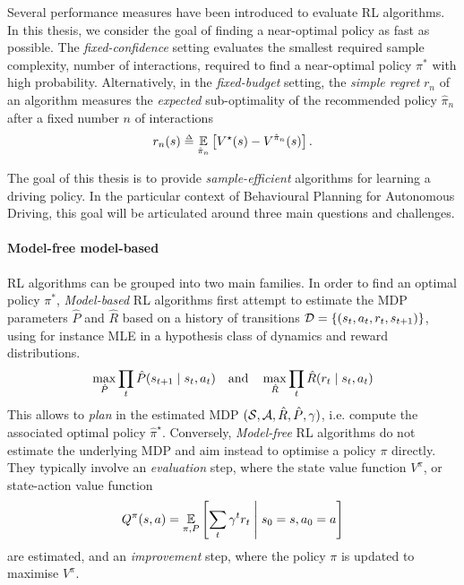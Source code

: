 Several performance measures have been introduced to evaluate \ac*{RL} algorithms. In this thesis, we consider the goal of finding a near-optimal policy as fast as possible. The \emph{fixed-confidence} setting evaluates the smallest required sample complexity, \ie number of interactions, required to find a near-optimal policy $\pi^*$ with high probability. Alternatively, in the \emph{fixed-budget} setting, the \emph{simple regret} $r_n$ of an algorithm measures the \emph{expected} sub-optimality of the recommended policy $\hat{\pi}_n$ after a fixed number $n$ of interactions
\begin{equation*}
r_n(s) \eqdef \expectedvalue_{\hat{\pi}_n} \left[ V^\star(s) - V^{\hat{\pi}_n}(s) \right].
\end{equation*}


The goal of this thesis is to provide \emph{sample-efficient} algorithms for learning a driving policy. In the particular context of Behavioural Planning for Autonomous Driving, this goal will be articulated around three main questions and challenges.

\paragraph{Model-free \vs model-based}

\ac*{RL} algorithms can be grouped into two main families. 
In order to find an optimal policy $\pi^*$, \emph{Model-based} \ac*{RL} algorithms first attempt to estimate the \ac*{MDP} parameters $\hat{P}$ and $\hat{R}$ based on a history of transitions $\mathcal{D} = \{(s_{t},a_t, r_t, s_{t+1})\}$, using for instance \ac{MLE} in a hypothesis class of dynamics and reward distributions.
\begin{equation*}
\max_{\hat{P}} \prod_{t}\hat{P}\lparen s_{t+1} \mid s_t,a_t\rparen \quad \text{and} \quad \max_{\hat{R}} \prod_{t}\hat{R}\lparen r_{t} \mid s_t,a_t\rparen
\end{equation*}
This allows to \emph{plan} in the estimated \ac*{MDP} $(\mathcal{S},\mathcal{A},\hat{R}, \hat{P}, \gamma)$, i.e. compute the associated optimal policy $\hat{\pi}^\star$. Conversely, \emph{Model-free} \ac*{RL} algorithms do not estimate the underlying \ac*{MDP} and aim instead to optimise a policy $\pi$ directly. They typically involve an \emph{evaluation} step, where the state value function $V^\pi$, or state-action value function
\begin{equation*}
Q^\pi(s,a) = \operatorname*{\mathbb{E}}_{\pi, P} \left[\sum_t \gamma^t r_t\;\middle|\; s_0 = s, a_0 = a\right]
\end{equation*}
are estimated, and an \emph{improvement} step, where the policy $\pi$ is updated to maximise $V^\pi$.

